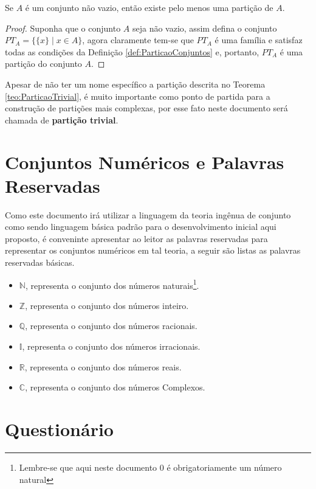 \begin{teorema}\label{teo:ParticaoTrivial}
	Se $A$ é um conjunto não vazio, então existe pelo menos uma partição de $A$.
\end{teorema}

\begin{proof}
	Suponha que o conjunto $A$ seja não vazio, assim defina o conjunto $PT_A = \{\{x\} \mid x \in A\}$, agora claramente tem-se que $PT_A$ é uma família e satisfaz todas as condições da Definição \ref{def:ParticaoConjuntos} e, portanto, $PT_A$ é uma partição do conjunto $A$.
\end{proof}

\begin{nota}
  Apesar de não ter um nome específico a partição descrita no Teorema \ref{teo:ParticaoTrivial}, é muito importante como ponto de partida para a construção de partições mais complexas, por esse fato neste documento será chamada de \textbf{partição trivial}.
\end{nota}

\section{Conjuntos Numéricos e Palavras Reservadas}

Como este documento irá  utilizar a linguagem da teoria ingênua de conjunto como sendo linguagem básica padrão para o desenvolvimento inicial aqui proposto, é conveninte apresentar ao leitor as palavras reservadas para representar os conjuntos numéricos em tal teoria, a seguir são listas as palavras reservadas básicas.

\begin{itemize}
  \item $\mathbb{N}$, representa o conjunto dos números naturais\footnote{Lembre-se que aqui neste documento $0$ é obrigatoriamente um número natural}.
  \item $\mathbb{Z}$, representa o conjunto dos números inteiro.
  \item $\mathbb{Q}$, representa o conjunto dos números racionais.
  \item $\mathbb{I}$, representa o conjunto dos números irracionais.
  \item $\mathbb{R}$, representa o conjunto dos números reais.
  \item $\mathbb{C}$, representa o conjunto dos números Complexos.
\end{itemize}

\section{Questionário}\label{sec:Questionario1part1}

